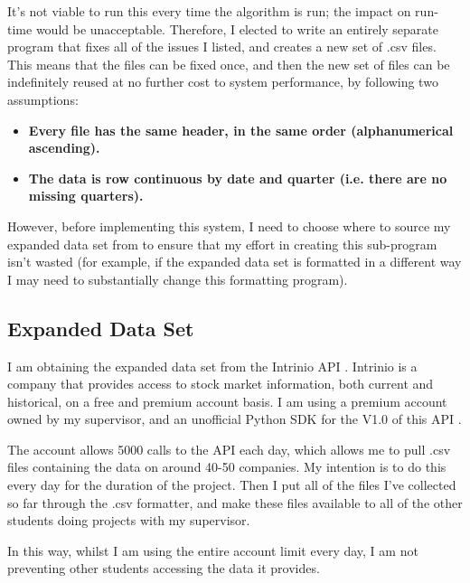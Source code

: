 It's not viable to run this every time the algorithm is run; the impact on run-time would be unacceptable. Therefore, I elected to write an entirely separate program that fixes all of the issues I listed, and creates a new set of .csv files. This means that the files can be fixed once, and then the new set of files can be indefinitely reused at no further cost to system performance, by following two assumptions:
\begin{itemize}
    \item \bf Every file has the same header, in the same order (alphanumerical ascending). \rm
    \item \bf The data is row continuous by date and quarter (i.e. there are no missing quarters). \rm
\end{itemize}

However, before implementing this system, I need to choose where to source my expanded data set from to ensure that my effort in creating this sub-program isn't wasted (for example, if the expanded data set is formatted in a different way I may need to substantially change this formatting program).

\subsection{Expanded Data Set}
I am obtaining the expanded data set from the Intrinio API \cite{intrinioApi}. Intrinio is a company that provides access to stock market information, both current and historical, on a free and premium account basis. I am using a premium account owned by my supervisor, and an unofficial Python SDK for the V1.0 of this API \cite{intrinioPython}. \newline

The account allows 5000 calls to the API each day, which allows me to pull .csv files containing the data on around 40-50 companies. My intention is to do this every day for the duration of the project. Then I put all of the files I've collected so far through the .csv formatter, and make these files available to all of the other students doing projects with my supervisor. \newline

In this way, whilst I am using the entire account limit every day, I am not preventing other students accessing the data it provides.

